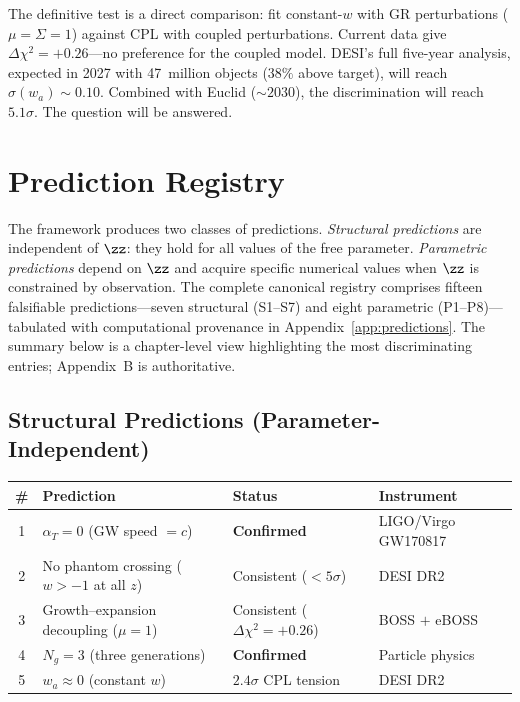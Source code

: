 The definitive test is a direct comparison: fit constant-$w$ with GR
perturbations ($\mu = \Sigma = 1$) against CPL with coupled
perturbations. Current data give $\Delta\chi^2 = +0.26$---no preference
for the coupled model. DESI's full five-year analysis, expected in
2027 with 47~million objects ($38\%$ above target), will reach
$\sigma(w_a) \sim 0.10$. Combined with Euclid ($\sim\!2030$), the
discrimination will reach $5.1\sigma$. The question will be answered.

\section{Prediction Registry}
\label{sec:0-registry}

The framework produces two classes of predictions. \emph{Structural
predictions} are independent of $\zz$: they hold for all values of the
free parameter. \emph{Parametric predictions} depend on $\zz$ and
acquire specific numerical values when $\zz$ is constrained by
observation. The complete canonical registry comprises fifteen
falsifiable predictions---seven structural (S1--S7) and eight parametric
(P1--P8)---tabulated with computational provenance in
Appendix~\ref{app:predictions}. The summary below is a chapter-level
view highlighting the most discriminating entries; Appendix~B is
authoritative.

\subsection*{Structural Predictions (Parameter-Independent)}

\begin{center}
\small
\begin{tabular}{@{}c p{6.1cm} p{3.4cm} l@{}}
\toprule
\textbf{\#} & \textbf{Prediction} & \textbf{Status} & \textbf{Instrument} \\
\midrule
1 & $\alpha_T = 0$ (GW speed $=c$) & \textbf{Confirmed} & LIGO/Virgo GW170817~\cite{ch1:gw170817} \\
2 & No phantom crossing ($w > -1$ at all $z$) & Consistent ($<5\sigma$) & DESI DR2~\cite{ch1:desi25} \\
3 & Growth--expansion decoupling ($\mu = 1$) & Consistent ($\Delta\chi^2 = +0.26$) & BOSS $+$ eBOSS \\
4 & $N_g = 3$ (three generations) & \textbf{Confirmed} & Particle physics \\
5 & $w_a \approx 0$ (constant $w$) & $2.4\sigma$ CPL tension & DESI DR2 \\
\bottomrule
\end{tabular}
\end{center}

